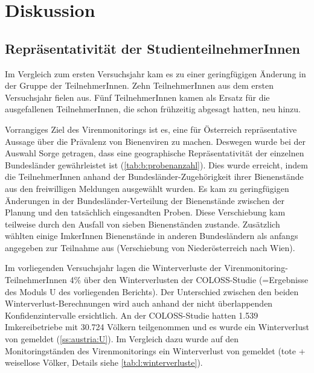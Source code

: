 \section{Diskussion}

\subsection{Repräsentativität der StudienteilnehmerInnen}

Im Vergleich zum ersten Versuchsjahr kam es zu einer geringfügigen Änderung in der Gruppe der TeilnehmerInnen. Zehn TeilnehmerInnen aus dem ersten Versuchsjahr fielen aus. Fünf TeilnehmerInnen kamen als Ersatz für die ausgefallenen TeilnehmerInnen, die schon frühzeitig abgesagt hatten, neu hinzu. 

Vorrangiges Ziel des Virenmonitorings ist es, eine für Österreich repräsentative Aussage über die Prävalenz von Bienenviren zu machen. Deswegen wurde bei der Auswahl Sorge getragen, dass eine geographische Repräsentativität der einzelnen Bundesländer gewährleistet ist (\cref{tab:b:probenanzahl}). Dies wurde erreicht, indem die TeilnehmerInnen anhand der Bundesländer-Zugehörigkeit ihrer Bienenstände aus den freiwilligen Meldungen ausgewählt wurden. Es kam zu geringfügigen Änderungen in der Bundesländer-Verteilung der Bienenstände zwischen der Planung und den tatsächlich eingesandten Proben. Diese Verschiebung kam teilweise durch den Ausfall von sieben Bienenständen zustande. Zusätzlich wählten einige ImkerInnen Bienenstände in anderen Bundesländern als anfangs angegeben zur Teilnahme aus (Verschiebung von Niederösterreich nach Wien).

Im vorliegenden Versuchsjahr lagen die Winterverluste der Virenmonitoring-TeilnehmerInnen 4\% über den Winterverlusten der COLOSS-Studie (=Ergebnisse des Moduls U des vorliegenden Berichts). Der Unterschied zwischen den beiden Winterverlust-Berechnungen wird auch anhand der nicht überlappenden Konfidenzintervalle ersichtlich. An der COLOSS-Studie hatten 1.539 Imkereibetriebe mit 30.724 Völkern teilgenommen und es wurde ein Winterverlust von  gemeldet (\cref{ss:austria:U}). Im Vergleich dazu wurde auf den Monitoringständen des Virenmonitorings ein Winterverlust von  gemeldet (tote + weisellose Völker, Details siehe \cref{tab:l:winterverluste}).

